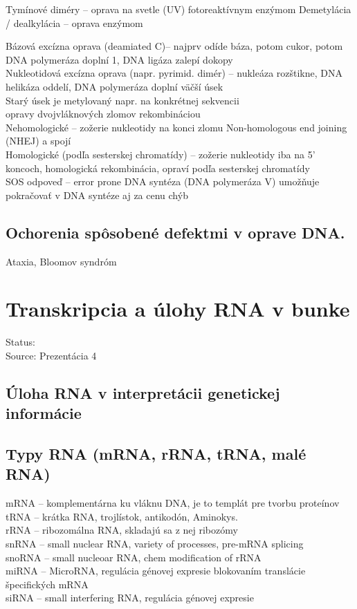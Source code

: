 Tymínové diméry -- oprava na svetle (UV) fotoreaktívnym enzýmom
Demetylácia / dealkylácia -- oprava enzýmom

Bázová excízna oprava (deamiated C)-- najprv odíde báza, potom cukor, potom DNA polymeráza doplní 1, DNA ligáza zalepí dokopy\\
Nukleotidová excízna oprava (napr. pyrimid. dimér) -- nukleáza rozštikne, DNA helikáza oddelí, DNA polymeráza doplní väčší úsek\\
Starý úsek je metylovaný napr. na konkrétnej sekvencii\\

opravy dvojvláknových zlomov rekombináciou\\
\tab Nehomologické -- zožerie nukleotidy na konci zlomu Non-homologous end joining (NHEJ) a spojí\\
\tab Homologické (podľa sesterskej chromatídy) -- zožerie nukleotidy iba na 5' koncoch, homologická rekombinácia, opraví podľa sesterskej chromatídy\\

SOS odpoveď -- error prone DNA syntéza (DNA polymeráza V) umožňuje pokračovať v DNA syntéze aj za cenu chýb\\
\subsection*{Ochorenia spôsobené defektmi v oprave DNA. }
Ataxia, Bloomov syndróm

\section{Transkripcia a úlohy RNA v bunke}

Status: \\
Source: Prezentácia 4\\

\subsection*{Úloha RNA v interpretácii genetickej informácie}

\subsection*{Typy RNA (mRNA, rRNA, tRNA, malé RNA)}
mRNA -- komplementárna ku vláknu DNA, je to templát pre tvorbu proteínov\\
tRNA -- krátka RNA, trojlístok, antikodón, Aminokys. \\
rRNA -- ribozomálna RNA, skladajú sa z nej ribozómy\\
snRNA -- small nuclear RNA, variety of processes, pre-mRNA splicing\\
snoRNA -- small nucleoar RNA, chem modification of rRNA\\
miRNA -- MicroRNA, regulácia génovej expresie blokovaním translácie špecifických mRNA\\
siRNA -- small interfering RNA, regulácia génovej expresie\\
